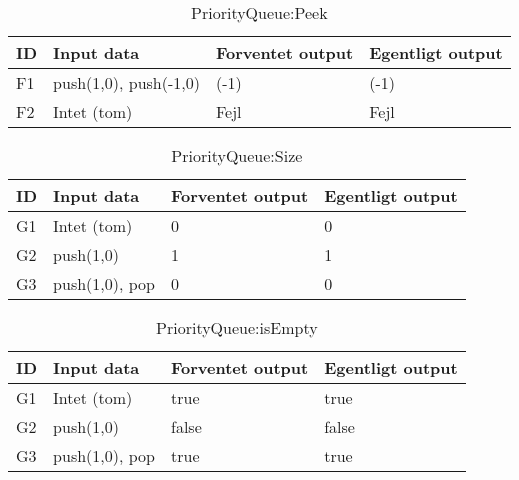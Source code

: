 \begin{table}[!h]
	\caption{PriorityQueue:Peek}
	\centering
	\begin{tabular}{L L L L}
		\hline\hline
		ID & Input data & Forventet output & Egentligt output \\ [0.5ex]
		\hline
		F1 & push(1,0), push(-1,0) & (-1) & (-1)\\
		F2 & Intet (tom) & Fejl & Fejl\\
		\hline
	\end{tabular}
\end{table}

\begin{table}[!h]
	\caption{PriorityQueue:Size}
	\centering
	\begin{tabular}{L L L L}
		\hline\hline
		ID & Input data & Forventet output & Egentligt output \\ [0.5ex]
		\hline
		G1 & Intet (tom) & 0 & 0\\
		G2 & push(1,0) & 1 & 1\\
		G3 & push(1,0), pop & 0 & 0\\
		\hline
	\end{tabular}
\end{table}

\begin{table}[!h]
	\caption{PriorityQueue:isEmpty}
	\centering
	\begin{tabular}{L L L L}
		\hline\hline
		ID & Input data & Forventet output & Egentligt output \\ [0.5ex]
		\hline
		G1 & Intet (tom) & true & true\\
		G2 & push(1,0) & false & false\\
		G3 & push(1,0), pop & true & true\\
		\hline
	\end{tabular}
\end{table}